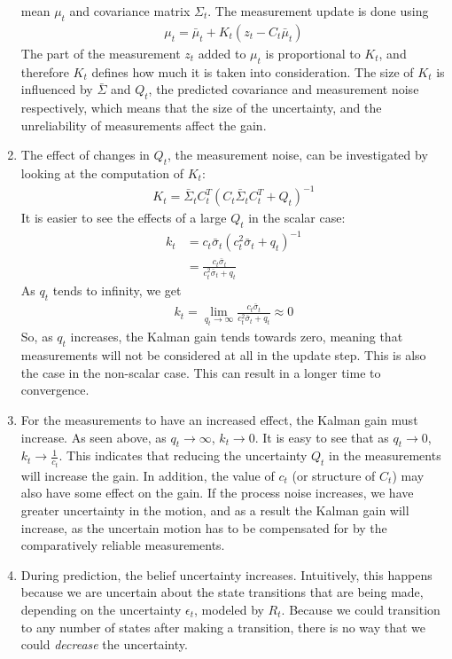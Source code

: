 \documentclass[a4paper,12pt]{article}
\begin{document}
\begin{enumerate}
  mean $\mu_t$ and covariance matrix $\Sigma_t$. The measurement update is done
  using
  \begin{align*}
    \mu_t=\bar{\mu}_t+K_t(z_t-C_t\bar{\mu}_t)
  \end{align*}
  The part of the measurement $z_t$ added to $\mu_t$ is proportional to $K_t$,
  and therefore $K_t$ defines how much it is taken into consideration. The size
  of $K_t$ is influenced by $\bar{\Sigma}$ and $Q_t$, the predicted covariance
  and measurement noise respectively, which means that the size of the
  uncertainty, and the unreliability of measurements affect the gain.
\item The effect of changes in $Q_t$, the measurement noise, can be investigated
  by looking at the computation of $K_t$:
  \begin{align*}
    K_t=\bar{\Sigma}_tC^T_t(C_t\bar{\Sigma}_tC^T_t+Q_t)^{-1}
  \end{align*}
It is easier to see the effects of a large $Q_t$ in the scalar case:
\begin{align*}
  k_t&=c_t\bar{\sigma}_t(c^2_t\bar{\sigma}_t+q_t)^{-1}\\
  &=\frac{c_t\bar{\sigma}_t}{c^2_t\bar{\sigma}_t+q_t}
\end{align*}
As $q_t$ tends to infinity, we get
\begin{align*}
  k_t=\lim_{q_t\to \infty}\frac{c_t\bar{\sigma}_t}{c^2_t\bar{\sigma}_t+q_t} \approx 0
\end{align*}
So, as $q_t$ increases, the Kalman gain tends towards zero, meaning that
measurements will not be considered at all in the update step. This is also the
case in the non-scalar case. This can result in a longer time to convergence.
\item For the measurements to have an increased effect, the Kalman gain must
  increase. As seen above, as $q_t\to \infty$, $k_t\to 0$. It is easy to see
  that as $q_t \to 0$, $k_t\to \frac{1}{c_t}$. This indicates that reducing the
  uncertainty $Q_t$ in the measurements will increase the gain. In addition, the
  value of $c_t$ (or structure of $C_t$) may also have some effect on the
  gain. If the process noise increases, we have greater uncertainty in the
  motion, and as a result the Kalman gain will increase, as the uncertain motion
  has to be compensated for by the comparatively reliable measurements.
\item During prediction, the belief uncertainty increases. Intuitively, this
  happens because we are uncertain about the state transitions that are being
  made, depending on the uncertainty $\epsilon_t$, modeled by $R_t$. Because we
  could transition to any number of states after making a transition, there is
  no way that we could \emph{decrease} the uncertainty.
  

\end{enumerate}
\end{document}

